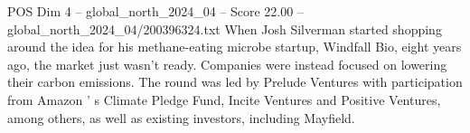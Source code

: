 \begin{textsample}{POS Dim 4 – global\_north\_2024\_04 – Score 22.00 – global\_north\_2024\_04/200396324.txt}
When Josh Silverman started shopping around the idea for his methane-eating microbe startup, Windfall Bio, eight years ago, the market just wasn't ready.
Companies were instead focused on lowering their carbon emissions.
The round was led by Prelude Ventures with participation from Amazon ' s Climate Pledge Fund, Incite Ventures and Positive Ventures, among others, as well as existing investors, including Mayfield.

\end{textsample}

